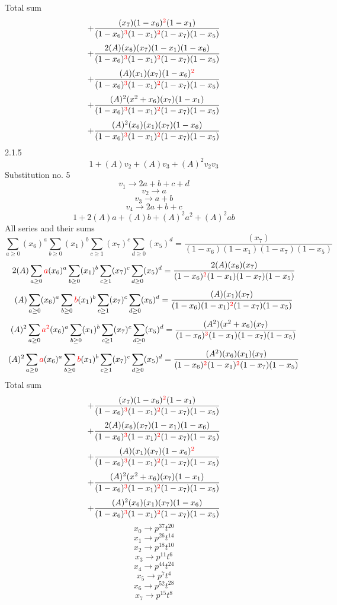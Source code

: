 \documentclass{article}
\begin{document}
Total sum
\[+\frac{(x_7)(1-x_6)^{\textcolor{red}{2}}(1-x_1)}{(1-x_6)^{\textcolor{red}{3}}(1-x_1)^{\textcolor{red}{2}}(1-x_7)(1-x_5)}\]\[+\frac{2(A)(x_6)(x_7)(1-x_1)(1-x_6)}{(1-x_6)^{\textcolor{red}{3}}(1-x_1)^{\textcolor{red}{2}}(1-x_7)(1-x_5)}\]\[+\frac{(A)(x_1)(x_7)(1-x_6)^{\textcolor{red}{2}}}{(1-x_6)^{\textcolor{red}{3}}(1-x_1)^{\textcolor{red}{2}}(1-x_7)(1-x_5)}\]\[+\frac{(A)^{2}(x^{2}+x_6)(x_7)(1-x_1)}{(1-x_6)^{\textcolor{red}{3}}(1-x_1)^{\textcolor{red}{2}}(1-x_7)(1-x_5)}\]\[+\frac{(A)^{2}(x_6)(x_1)(x_7)(1-x_6)}{(1-x_6)^{\textcolor{red}{3}}(1-x_1)^{\textcolor{red}{2}}(1-x_7)(1-x_5)}\]
2.1.5
\[1+(A)v_2+(A)v_3+(A)^2v_2v_3\]Substitution no. 5\[v_1\rightarrow{2a+b+c+d}\]\[v_2\rightarrow{a}\]\[v_3\rightarrow{a+b}\]\[v_4\rightarrow{2a+b+c}\]\[1+2(A)a+(A)b+(A)^2a^{2}+(A)^2ab\]All series and their sums\[\sum_{a\geq{0}}(x_6)^{a}\sum_{b\geq{0}}(x_1)^{b}\sum_{c\geq{1}}(x_7)^{c}\sum_{d\geq{0}}(x_5)^{d}=\frac{(x_7)}{(1-x_6)(1-x_1)(1-x_7)(1-x_5)}\]\[2(A)\sum_{a\geq{0}}\textcolor{red}{a}(x_6)^{a}\sum_{b\geq{0}}(x_1)^{b}\sum_{c\geq{1}}(x_7)^{c}\sum_{d\geq{0}}(x_5)^{d}=\frac{2(A)(x_6)(x_7)}{(1-x_6)^{\textcolor{red}{2}}(1-x_1)(1-x_7)(1-x_5)}\]\[(A)\sum_{a\geq{0}}(x_6)^{a}\sum_{b\geq{0}}\textcolor{red}{b}(x_1)^{b}\sum_{c\geq{1}}(x_7)^{c}\sum_{d\geq{0}}(x_5)^{d}=\frac{(A)(x_1)(x_7)}{(1-x_6)(1-x_1)^{\textcolor{red}{2}}(1-x_7)(1-x_5)}\]\[(A)^{2}\sum_{a\geq{0}}\textcolor{red}{a^{2}}(x_6)^{a}\sum_{b\geq{0}}(x_1)^{b}\sum_{c\geq{1}}(x_7)^{c}\sum_{d\geq{0}}(x_5)^{d}=\frac{(A^{2})(x^{2}+x_6)(x_7)}{(1-x_6)^{\textcolor{red}{3}}(1-x_1)(1-x_7)(1-x_5)}\]\[(A)^{2}\sum_{a\geq{0}}\textcolor{red}{a}(x_6)^{a}\sum_{b\geq{0}}\textcolor{red}{b}(x_1)^{b}\sum_{c\geq{1}}(x_7)^{c}\sum_{d\geq{0}}(x_5)^{d}=\frac{(A^{2})(x_6)(x_1)(x_7)}{(1-x_6)^{\textcolor{red}{2}}(1-x_1)^{\textcolor{red}{2}}(1-x_7)(1-x_5)}\]
Total sum
\[+\frac{(x_7)(1-x_6)^{\textcolor{red}{2}}(1-x_1)}{(1-x_6)^{\textcolor{red}{3}}(1-x_1)^{\textcolor{red}{2}}(1-x_7)(1-x_5)}\]\[+\frac{2(A)(x_6)(x_7)(1-x_1)(1-x_6)}{(1-x_6)^{\textcolor{red}{3}}(1-x_1)^{\textcolor{red}{2}}(1-x_7)(1-x_5)}\]\[+\frac{(A)(x_1)(x_7)(1-x_6)^{\textcolor{red}{2}}}{(1-x_6)^{\textcolor{red}{3}}(1-x_1)^{\textcolor{red}{2}}(1-x_7)(1-x_5)}\]\[+\frac{(A)^{2}(x^{2}+x_6)(x_7)(1-x_1)}{(1-x_6)^{\textcolor{red}{3}}(1-x_1)^{\textcolor{red}{2}}(1-x_7)(1-x_5)}\]\[+\frac{(A)^{2}(x_6)(x_1)(x_7)(1-x_6)}{(1-x_6)^{\textcolor{red}{3}}(1-x_1)^{\textcolor{red}{2}}(1-x_7)(1-x_5)}\]\[x_0\rightarrow{p^{37}t^{20}}\]\[x_1\rightarrow{p^{26}t^{14}}\]\[x_2\rightarrow{p^{18}t^{10}}\]\[x_3\rightarrow{p^{11}t^{6}}\]\[x_4\rightarrow{p^{44}t^{24}}\]\[x_5\rightarrow{p^{7}t^{4}}\]\[x_6\rightarrow{p^{52}t^{28}}\]\[x_7\rightarrow{p^{15}t^{8}}\]
\end{document}
